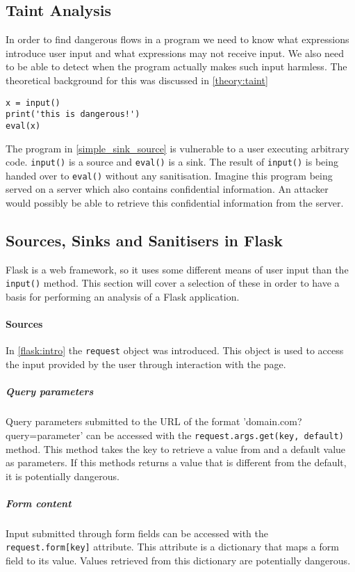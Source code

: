\subsection{Taint Analysis}
In order to find dangerous flows in a program we need to know what expressions introduce user input and what expressions may not receive input.
We also need to be able to detect when the program actually makes such input harmless.
The theoretical background for this was discussed in \cref{theory:taint}

\begin{lstlisting}[style=python, caption={A simple vulnerable program}, label=simple_sink_source]
x = input()
print('this is dangerous!')
eval(x)
\end{lstlisting}

The program in \cref{simple_sink_source} is vulnerable to a user executing arbitrary code.
\texttt{input()} is a source and \texttt{eval()} is a sink.
The result of \texttt{input()} is being handed over to \texttt{eval()} without any sanitisation.
Imagine this program being served on a server which also contains confidential information.
An attacker would possibly be able to retrieve this confidential information from the server.

\subsection{Sources, Sinks and Sanitisers in Flask}
Flask is a web framework, so it uses some different means of user input than the \texttt{input()} method.
This section will cover a selection of these in order to have a basis for performing an analysis of a Flask application.

\paragraph{Sources}
In \cref{flask:intro} the \texttt{request} object was introduced.
This object is used to access the input provided by the user through interaction with the page.

\subparagraph{Query parameters}
Query parameters submitted to the URL of the format 'domain.com?query=parameter' can be accessed with the \texttt{request.args.get(key, default)} method.
This method takes the key to retrieve a value from and a default value as parameters.
If this methods returns a value that is different from the default, it is potentially dangerous.

\subparagraph{Form content}
Input submitted through form fields can be accessed with the \texttt{request.form[key]} attribute.
This attribute is a dictionary that maps a form field to its value.
Values retrieved from this dictionary are potentially dangerous.

